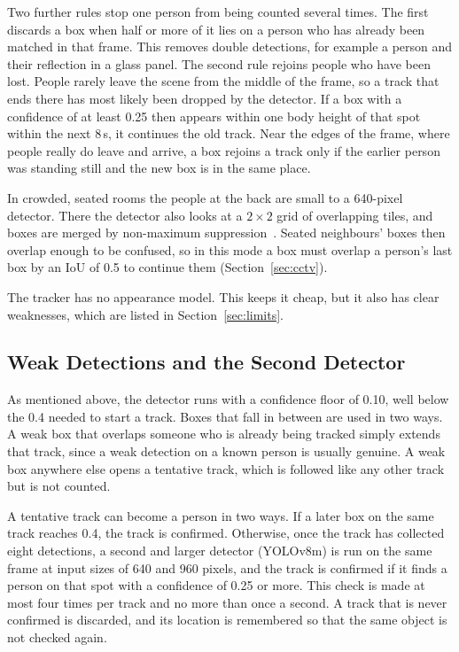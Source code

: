 \documentclass[conference]{IEEEtran}
\begin{document}
Two further rules stop one person from being counted several times. The first
discards a box when half or more of it lies on a person who has already been
matched in that frame. This removes double detections, for example a person and
their reflection in a glass panel. The second rule rejoins people who have been
lost. People rarely leave the scene from the middle of the frame, so a track that
ends there has most likely been dropped by the detector. If a box with a
confidence of at least 0.25 then appears within one body height of that spot
within the next 8\,s, it continues the old track. Near the edges of the frame,
where people really do leave and arrive, a box rejoins a track only if the earlier
person was standing still and the new box is in the same place.

In crowded, seated rooms the people at the back are small to a 640-pixel
detector. There the detector also looks at a $2\times2$ grid of overlapping tiles,
and boxes are merged by non-maximum suppression~\cite{akyon2022sahi}. Seated
neighbours' boxes then overlap enough to be confused, so in this mode a box must
overlap a person's last box by an IoU of 0.5 to continue them
(Section~\ref{sec:cctv}).

The tracker has no appearance model. This keeps it cheap, but it also has clear
weaknesses, which are listed in Section~\ref{sec:limits}.

\subsection{Weak Detections and the Second Detector}
\label{sec:hunches}
As mentioned above, the detector runs with a confidence floor of 0.10, well below
the 0.4 needed to start a track. Boxes that fall in between are used in two ways.
A weak box that overlaps someone who is already being tracked simply extends that
track, since a weak detection on a known person is usually genuine. A weak box
anywhere else opens a tentative track, which is followed like any other track but
is not counted.

A tentative track can become a person in two ways. If a later box on the same
track reaches 0.4, the track is confirmed. Otherwise, once the track has collected
eight detections, a second and larger detector (YOLOv8m) is run on the same frame
at input sizes of 640 and 960 pixels, and the track is confirmed if it finds a
person on that spot with a confidence of 0.25 or more. This check is made at most
four times per track and no more than once a second. A track that is never
confirmed is discarded, and its location is remembered so that the same object is
not checked again.
\end{document}
